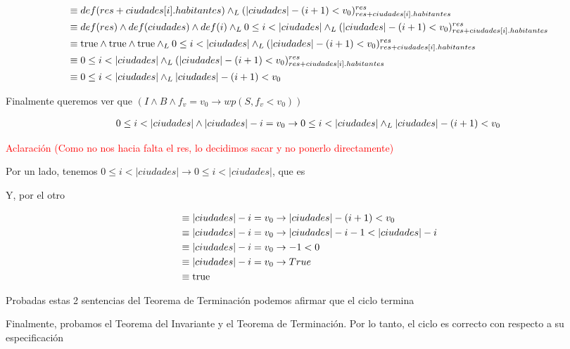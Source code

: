 \documentclass[10pt,a4paper]{article}
\begin{document}
\begin {enumerate}
    \begin{align*}
        &\equiv def (res + ciudades[i].habitantes) \land _L (|ciudades| - (i + 1) < v_{0})_{res + ciudades[i].habitantes}^{res} \\
        &\equiv def(res) \land def(ciudades) \land def(i) \land _L 0 \leq i < |ciudades| \land _L (|ciudades| - (i + 1) < v_{0})_{res + ciudades[i].habitantes}^{res}\\
        &\equiv \mathrm{true} \land \mathrm{true} \land \mathrm{true} \land _L 0 \leq i < |ciudades| \land _L (|ciudades| - (i + 1) < v_{0})_{res + ciudades[i].habitantes}^{res}\\
        &\equiv 0 \leq i < |ciudades| \land _L (|ciudades| - (i + 1) < v_{0})_{res + ciudades[i].habitantes}^{res}\\
        &\equiv 0 \leq i < |ciudades| \land _L |ciudades| - (i + 1) < v_{0}
    \end{align*}

    Finalmente queremos ver que $(I \land B \land f_{v} = v_{0} \to wp(S, f_{v} < v_{0}))$


    \begin{align*}
        0 \leq i < |ciudades| \land |ciudades| - i = v_{0} \to 0 \leq i < |ciudades| \land _L |ciudades| - (i + 1) < v_{0}
    \end{align*}

    \textcolor{red}{Aclaración (Como no nos hacia falta el res, lo decidimos sacar y no ponerlo directamente)}

    Por un lado, tenemos $0 \leq i < |ciudades| \to 0 \leq i < |ciudades|$, que es \True

    Y, por el otro 

    \begin{align*}
        &\equiv |ciudades| - i = v_{0} \to |ciudades| - (i + 1) < v_{0} \\
        &\equiv |ciudades| - i = v_{0} \to |ciudades| - i - 1 < |ciudades| - i \\
        &\equiv |ciudades| - i = v_{0} \to - 1 < 0 \\
        &\equiv |ciudades| - i = v_{0} \to True \\
        &\equiv \mathrm{true}   
    \end{align*}

    Probadas estas 2 sentencias del Teorema de  Terminación podemos afirmar que el ciclo termina

    Finalmente, probamos el Teorema del Invariante y el Teorema de Terminación. Por lo tanto, el ciclo es correcto con respecto a su especificación


\end{enumerate}
\end{document}

